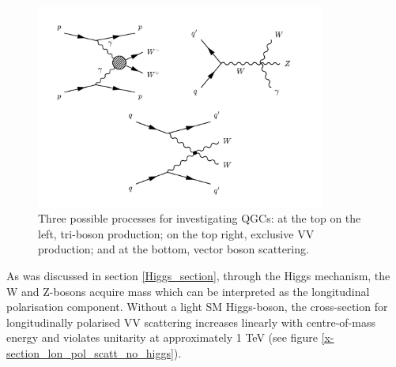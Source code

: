 \begin{figure}
\centering
\includegraphics[width=0.85\textwidth]{images/ssWW/VV_prod.pdf}
\caption{Three possible processes for investigating QGCs: at the top on the left, tri-boson production; on the top right, exclusive VV production; and at the bottom, vector boson scattering.}
\label{vv_prod}
\end{figure}

As was discussed in section \ref{Higgs_section}, through the Higgs mechanism, the W and Z-bosons acquire mass which can be interpreted as the longitudinal polarisation component. Without a light SM Higgs-boson, the cross-section for longitudinally polarised VV scattering increases linearly with centre-of-mass energy and violates unitarity at approximately 1 TeV \cite{ssWW} (see figure \ref{x-section_lon_pol_scatt_no_higgs}).

